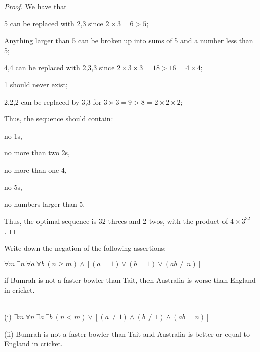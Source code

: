 \documentclass[12pt]{article}
\begin{document}
\begin{proof}
    We have that
    \begin{compactenum}[(i)]
    \item 5 can be replaced with 2,3 since $2 \times 3 = 6 > 5$;
    \item Anything larger than 5 can be broken up into sums of 5 and a number less than 5;
    \item 4,4 can be replaced with 2,3,3 since $2 \times 3 \times 3 = 18 > 16 = 4 \times 4$;
    \item 1 should never exist;
    \item 2,2,2 can be replaced by 3,3 for $3 \times 3 = 9 > 8 = 2 \times 2 \times 2$;
    \end{compactenum}
    Thus, the sequence should contain:
    \begin{compactenum}[(i)]
    \item no 1s,
    \item no more than two 2s,
    \item no more than one 4,
    \item no 5s,
    \item no numbers larger than 5.
    \end{compactenum}
    Thus, the optimal sequence is 32 threes and 2 twos,
    with the product of $4 \times 3^{32}$.
\end{proof}

\begin{question}
    Write down the negation of the following assertions:
    \begin{compactenum}[(i)]
        \item $\forall m\ \exists n\ \forall a\ \forall b\ (n \ge m) \land [(a = 1) \lor (b = 1) \lor (ab \ne n)]$
        \item if Bumrah is not a faster bowler than Tait, 
            then Australia is worse than England in cricket.
    \end{compactenum}
\end{question}

\begin{answer}\ \\
    (i)
    $\exists m\ \forall n\ \exists a\ \exists b\ (n < m) \lor [(a \ne 1) \land (b \ne 1) \land (ab = n)]$

    (ii) 
    Bumrah is not a faster bowler than Tait and Australia is better or equal to England in cricket.
\end{answer}
\end{document}

